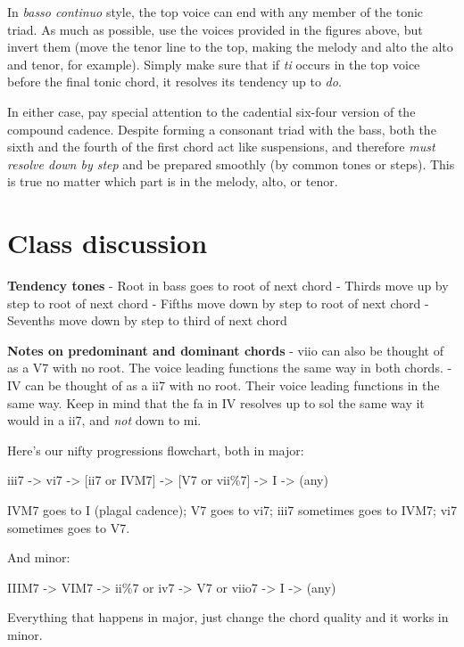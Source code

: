 \documentclass{book}
\begin{document}
In \emph{basso continuo} style, the top voice can end with any member of the
tonic triad. As much as possible, use the voices provided in the figures
above, but invert them (move the tenor line to the top, making the melody and
alto the alto and tenor, for example). Simply make sure that if \emph{ti}
occurs in the top voice before the final tonic chord, it resolves its tendency
up to \emph{do}.

In either case, pay special attention to the cadential six-four version of the
compound cadence. Despite forming a consonant triad with the bass, both the
sixth and the fourth of the first chord act like suspensions, and therefore
\emph{must resolve down by step} and be prepared smoothly (by common tones or
steps). This is true no matter which part is in the melody, alto, or tenor.

\hypertarget{class-discussion-2}{%
\chapter{Class discussion}\label{class-discussion-2}}

\textbf{Tendency tones} - Root in bass goes to root of next chord - Thirds
move up by step to root of next chord - Fifths move down by step to root of
next chord - Sevenths move down by step to third of next chord

\textbf{Notes on predominant and dominant chords} - viio can also be thought
of as a V7 with no root. The voice leading functions the same way in both
chords. - IV can be thought of as a ii7 with no root. Their voice leading
functions in the same way. Keep in mind that the fa in IV resolves up to sol
the same way it would in a ii7, and \emph{not} down to mi.

Here's our nifty progressions flowchart, both in major:

iii7 -\textgreater{} vi7 -\textgreater{} {[}ii7 or IVM7{]} -\textgreater{}
{[}V7 or vii\%7{]} -\textgreater{} I -\textgreater{} (any)

IVM7 goes to I (plagal cadence); V7 goes to vi7; iii7 sometimes goes to IVM7;
vi7 sometimes goes to V7.

And minor:

IIIM7 -\textgreater{} VIM7 -\textgreater{} ii\%7 or iv7 -\textgreater{} V7 or
viio7 -\textgreater{} I -\textgreater{} (any)

Everything that happens in major, just change the chord quality and it works
in minor.
\end{document}
